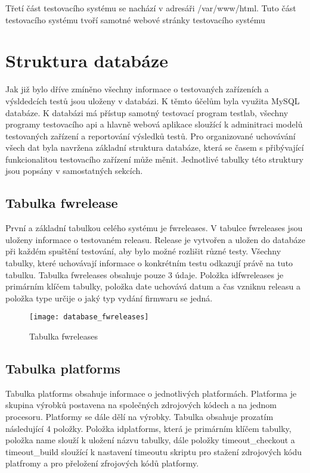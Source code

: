 Třetí část testovacího systému se nachází v adresáři /var/www/html. Tuto část testovacího systému tvoří samotné webové stránky testovacího systému

\section{Struktura databáze}
Jak již bylo dříve zmíněno všechny informace o testovaných zařízeních a výsldedcích testů jsou uloženy v databázi. K těmto účelům byla využita MySQL databáze. K databázi má přístup samotný testovací program testlab, všechny programy testovacího api a hlavně webová aplikace sloužící k adminitraci modelů testovaných zařízení a reportování výsledků testů. Pro organizované uchovávání všech dat byla navržena základní struktura databáze, která se časem s přibývající funkcionalitou testovacího zařízení může měnit. Jednotlivé tabulky této struktury jsou popsány v samostatných sekcích.

\subsection{Tabulka fwrelease}
První a základní tabulkou celého systému je fwreleases. V tabulce fwreleases jsou uloženy informace o testovaném releasu. Release je vytvořen a uložen do databáze při každém spuštění testování, aby bylo možné rozlišit různé testy. Všechny tabulky, které uchovávají informace o konkrétním testu odkazují právě na tuto tabulku. Tabulka fwreleases obsahuje pouze 3 údaje. Položka idfwreleases je primárním klíčem tabulky, položka date uchovává datum a čas vzniknu releasu a položka type určije o jaký typ vydání firmwaru se jedná.

\begin{figure}[h]
  \centering
  \texttt{[image: database\_fwreleases]}
  \caption{Tabulka fwreleases}
  \label{fig:database_fwreleases}
\end{figure}

\subsection{Tabulka platforms}
Tabulka platforms obsahuje informace o jednotlivých platformách. Platforma je skupina výrobků postavena na společných zdrojových kódech a na jednom procesoru. Platformy se dále dělí na výrobky. Tabulka obsahuje prozatím následující 4 položky. Položka idplatforms, která je primárním klíčem tabulky, položka name slouží k uložení názvu tabulky, dále položky timeout\_checkout a timeout\_build sloužící k nastavení timeoutu skriptu pro stažení zdrojových kódu platfromy a pro přeložení zfrojových kódů platformy.

